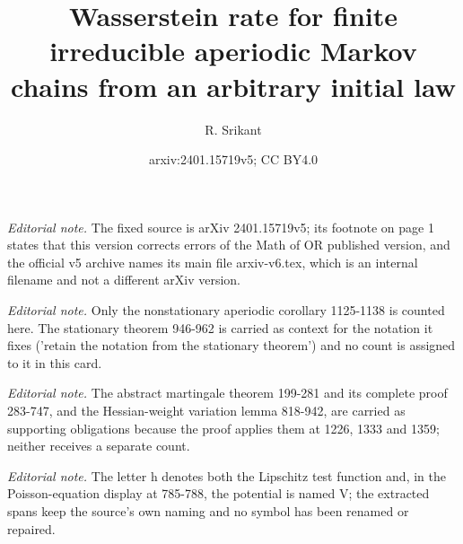 \documentclass[10pt,a4paper]{article}
\title{Wasserstein rate for finite irreducible aperiodic Markov chains from an arbitrary initial law}
\author{R. Srikant}
\date{arxiv:2401.15719v5; CC BY4.0}
\begin{document}
\maketitle
\noindent\textit{Editorial note.} The fixed source is arXiv 2401.15719v5; its footnote on page 1 states that this version corrects errors of the Math of OR published version, and the official v5 archive names its main file arxiv-v6.tex, which is an internal filename and not a different arXiv version.\par\medskip
\noindent\textit{Editorial note.} Only the nonstationary aperiodic corollary 1125-1138 is counted here. The stationary theorem 946-962 is carried as context for the notation it fixes ('retain the notation from the stationary theorem') and no count is assigned to it in this card.\par\medskip
\noindent\textit{Editorial note.} The abstract martingale theorem 199-281 and its complete proof 283-747, and the Hessian-weight variation lemma 818-942, are carried as supporting obligations because the proof applies them at 1226, 1333 and 1359; neither receives a separate count.\par\medskip
\noindent\textit{Editorial note.} The letter h denotes both the Lipschitz test function and, in the Poisson-equation display at 785-788, the potential is named V; the extracted spans keep the source's own naming and no symbol has been renamed or repaired.\par\medskip
\end{document}
